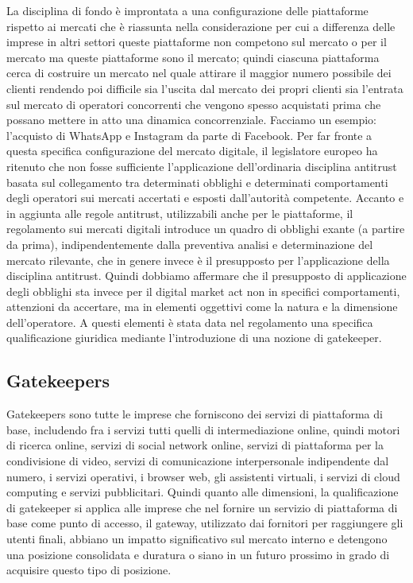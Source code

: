 La disciplina di fondo è improntata a una configurazione delle piattaforme rispetto ai mercati che è riassunta nella considerazione per cui a differenza delle imprese in altri settori queste piattaforme non competono sul mercato o per il mercato ma queste piattaforme sono il mercato; quindi ciascuna piattaforma cerca di costruire un mercato nel quale attirare il maggior numero possibile dei clienti rendendo poi difficile sia l'uscita dal mercato dei propri clienti sia l'entrata sul mercato di operatori concorrenti che vengono spesso acquistati prima che possano mettere in atto una dinamica concorrenziale.
Facciamo un esempio: l'acquisto di WhatsApp e Instagram da parte di Facebook.
Per far fronte a questa specifica configurazione del mercato digitale, il legislatore europeo ha ritenuto che non fosse sufficiente l'applicazione dell'ordinaria disciplina antitrust basata sul collegamento tra determinati obblighi e determinati comportamenti degli operatori sui mercati accertati e esposti dall'autorità competente.
Accanto e in aggiunta alle regole antitrust, utilizzabili anche per le piattaforme, il regolamento sui mercati digitali introduce un quadro di obblighi exante (a partire da prima), indipendentemente dalla preventiva analisi e determinazione del mercato rilevante, che in genere invece è il presupposto per l'applicazione della disciplina antitrust.
Quindi dobbiamo affermare che il presupposto di applicazione degli obblighi sta invece per il digital market act non in specifici comportamenti, attenzioni da accertare, ma in elementi oggettivi come la natura e la dimensione dell'operatore.
A questi elementi è stata data nel regolamento una specifica qualificazione giuridica mediante l'introduzione di una nozione di gatekeeper.

\subsection{Gatekeepers}
Gatekeepers sono tutte le imprese che forniscono dei servizi di piattaforma di base, includendo fra i servizi tutti quelli di intermediazione online, quindi motori di ricerca online, servizi di social network online, servizi di piattaforma per la condivisione di video, servizi di comunicazione interpersonale indipendente dal numero, i servizi operativi, i browser web, gli assistenti virtuali, i servizi di cloud computing e servizi pubblicitari.
Quindi quanto alle dimensioni, la qualificazione di gatekeeper si applica alle imprese che nel fornire un servizio di piattaforma di base come punto di accesso, il gateway, utilizzato dai fornitori per raggiungere gli utenti finali, abbiano un impatto significativo sul mercato interno e detengono una posizione consolidata e duratura o siano in un futuro prossimo in grado di acquisire questo tipo di posizione.

